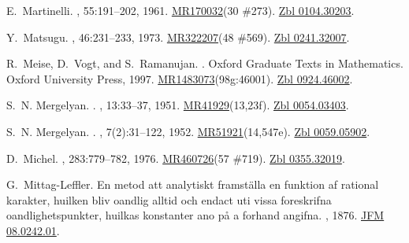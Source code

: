 \documentclass[11pt,a4paper, final, twoside]{article}
\numberwithin{equation}{section}
\begin{document}
\begin{appendices}
\begin{thebibliography}{100}
E.~Martinelli.
,
  55:191--202, 1961.
\newblock \href{http://www.ams.org/mathscinet-getitem?mr=170032}{MR170032}(30
  \#273). \href{http://zbmath.org/?q=an:0104.30203}{Zbl 0104.30203}.

Y.~Matsugu.
, 46:231--233, 1973.
\newblock \href{http://www.ams.org/mathscinet-getitem?mr=322207}{MR322207}(48
  \#569). \href{http://zbmath.org/?q=an:0241.32007}{Zbl 0241.32007}.

R.~Meise, D.~Vogt, and S.~Ramanujan.
.
\newblock Oxford Graduate Texts in Mathematics. Oxford University Press, 1997.
\newblock
  \href{http://www.ams.org/mathscinet-getitem?mr=1483073}{MR1483073}(98g:46001).
  \href{http://zbmath.org/?q=an:0924.46002}{Zbl 0924.46002}.

S.~N. Mergelyan.
.
, 13:33--37, 1951.
\newblock
  \href{http://www.ams.org/mathscinet-getitem?mr=41929}{MR41929}(13,23f).
  \href{http://zbmath.org/?q=an:0054.03403}{Zbl 0054.03403}.

S.~N. Mergelyan.
.
, 7(2):31--122, 1952.
\newblock
  \href{http://www.ams.org/mathscinet-getitem?mr=51921}{MR51921}(14,547e).
  \href{http://zbmath.org/?q=an:0059.05902}{Zbl 0059.05902}.

D.~Michel.
, 283:779--782, 1976.
\newblock \href{http://www.ams.org/mathscinet-getitem?mr=460726}{MR460726}(57
  \#719). \href{http://zbmath.org/?q=an:0355.32019}{Zbl 0355.32019}.

G.~Mittag-Leffler.
\newblock En metod att analytiskt framst\"alla en funktion af rational
  karakter, huilken bliv oandlig alltid och endact uti vissa foreskrifna
  oandlighetspunkter, huilkas konstanter ano p{\aa} a forhand angifna.
, 1876.
\newblock \href{http://zbmath.org/?q=an:08.0242.01}{JFM 08.0242.01}.


\end{thebibliography}
\end{appendices}
\end{document}
